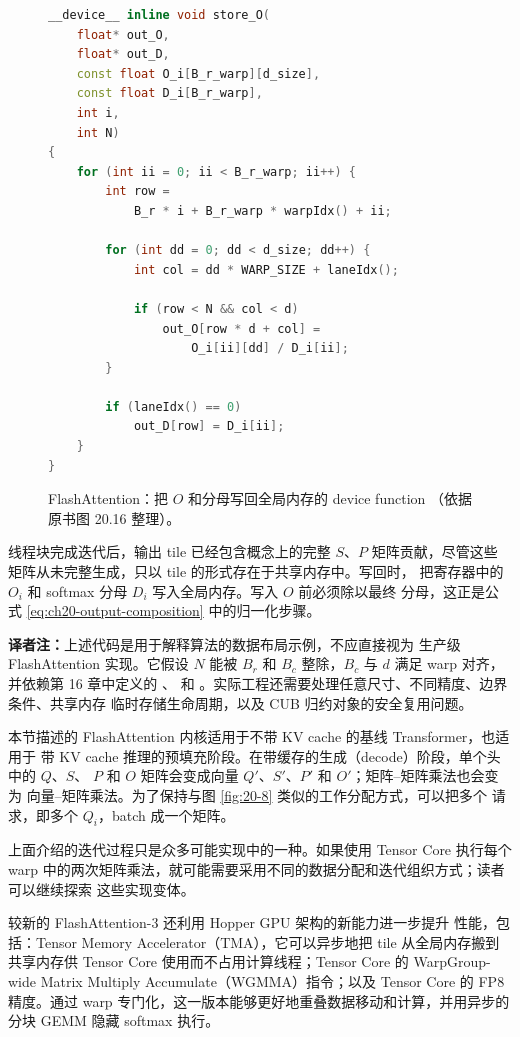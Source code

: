 \begin{figure}[htbp]
  \centering
  \begin{lstlisting}[language=C++,basicstyle=\ttfamily\scriptsize]
__device__ inline void store_O(
    float* out_O,
    float* out_D,
    const float O_i[B_r_warp][d_size],
    const float D_i[B_r_warp],
    int i,
    int N)
{
    for (int ii = 0; ii < B_r_warp; ii++) {
        int row =
            B_r * i + B_r_warp * warpIdx() + ii;

        for (int dd = 0; dd < d_size; dd++) {
            int col = dd * WARP_SIZE + laneIdx();

            if (row < N && col < d)
                out_O[row * d + col] =
                    O_i[ii][dd] / D_i[ii];
        }

        if (laneIdx() == 0)
            out_D[row] = D_i[ii];
    }
}
  \end{lstlisting}
  \caption{FlashAttention：把 $O$ 和分母写回全局内存的 device function
  （依据原书图 20.16 整理）。}
  \label{fig:20-16}
\end{figure}

线程块完成迭代后，输出 tile 已经包含概念上的完整 $S$、$P$ 矩阵贡献，尽管这些
矩阵从未完整生成，只以 tile 的形式存在于共享内存中。写回时，
把寄存器中的 $O_i$ 和 softmax 分母 $D_i$ 写入全局内存。写入 $O$ 前必须除以最终
分母，这正是公式 \eqref{eq:ch20-output-composition} 中的归一化步骤。

\noindent\textbf{译者注：}上述代码是用于解释算法的数据布局示例，不应直接视为
生产级 FlashAttention 实现。它假设 $N$ 能被 $B_r$ 和 $B_c$ 整除，$B_c$ 与 $d$
满足 warp 对齐，并依赖第 16 章中定义的 、 和
。实际工程还需要处理任意尺寸、不同精度、边界条件、共享内存
临时存储生命周期，以及 CUB 归约对象的安全复用问题。

本节描述的 FlashAttention 内核适用于不带 KV cache 的基线 Transformer，也适用于
带 KV cache 推理的预填充阶段。在带缓存的生成（decode）阶段，单个头中的 $Q$、$S$、
$P$ 和 $O$ 矩阵会变成向量 $Q'$、$S'$、$P'$ 和 $O'$；矩阵--矩阵乘法也会变为
向量--矩阵乘法。为了保持与图 \ref{fig:20-8} 类似的工作分配方式，可以把多个
请求，即多个 $Q_i$，batch 成一个矩阵。

上面介绍的迭代过程只是众多可能实现中的一种。如果使用 Tensor Core 执行每个 warp
中的两次矩阵乘法，就可能需要采用不同的数据分配和迭代组织方式；读者可以继续探索
这些实现变体。

较新的 FlashAttention-3 \cite{ch20-9} 还利用 Hopper GPU 架构的新能力进一步提升
性能，包括：Tensor Memory Accelerator（TMA），它可以异步地把 tile 从全局内存搬到
共享内存供 Tensor Core 使用而不占用计算线程；Tensor Core 的 WarpGroup-wide
Matrix Multiply Accumulate（WGMMA）指令；以及 Tensor Core 的 FP8 精度。通过 warp
专门化，这一版本能够更好地重叠数据移动和计算，并用异步的分块 GEMM 隐藏 softmax
执行。

